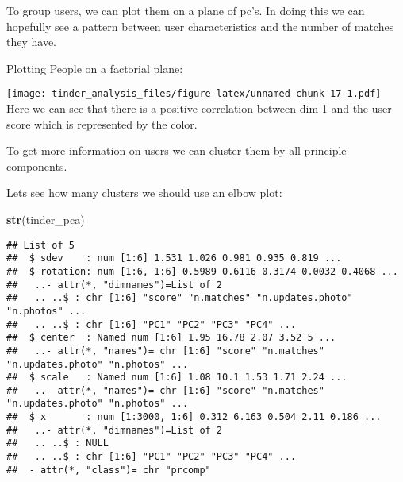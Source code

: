 \documentclass[
]{article}
\newenvironment{Shaded}{\begin{snugshade}}{\end{snugshade}}
\newcommand{\AttributeTok}[1]{\textcolor[rgb]{0.13,0.29,0.53}{#1}}
\newcommand{\CommentTok}[1]{\textcolor[rgb]{0.56,0.35,0.01}{\textit{#1}}}
\newcommand{\ConstantTok}[1]{\textcolor[rgb]{0.56,0.35,0.01}{#1}}
\newcommand{\DecValTok}[1]{\textcolor[rgb]{0.00,0.00,0.81}{#1}}
\newcommand{\FunctionTok}[1]{\textcolor[rgb]{0.13,0.29,0.53}{\textbf{#1}}}
\newcommand{\NormalTok}[1]{#1}
\newcommand{\SpecialCharTok}[1]{\textcolor[rgb]{0.81,0.36,0.00}{\textbf{#1}}}
\newcommand{\StringTok}[1]{\textcolor[rgb]{0.31,0.60,0.02}{#1}}
\begin{document}
To group users, we can plot them on a plane of pc's. In doing this we
can hopefully see a pattern between user characteristics and the number
of matches they have.

Plotting People on a factorial plane:

\begin{Shaded}
\end{Shaded}

\texttt{[image: tinder\_analysis\_files/figure-latex/unnamed-chunk-17-1.pdf]}
Here we can see that there is a positive correlation between dim 1 and
the user score which is represented by the color.

To get more information on users we can cluster them by all principle
components.

Lets see how many clusters we should use an elbow plot:

\begin{Shaded}
\begin{Highlighting}[]
\FunctionTok{str}\NormalTok{(tinder\_pca)}
\end{Highlighting}
\end{Shaded}

\begin{verbatim}
## List of 5
##  $ sdev    : num [1:6] 1.531 1.026 0.981 0.935 0.819 ...
##  $ rotation: num [1:6, 1:6] 0.5989 0.6116 0.3174 0.0032 0.4068 ...
##   ..- attr(*, "dimnames")=List of 2
##   .. ..$ : chr [1:6] "score" "n.matches" "n.updates.photo" "n.photos" ...
##   .. ..$ : chr [1:6] "PC1" "PC2" "PC3" "PC4" ...
##  $ center  : Named num [1:6] 1.95 16.78 2.07 3.52 5 ...
##   ..- attr(*, "names")= chr [1:6] "score" "n.matches" "n.updates.photo" "n.photos" ...
##  $ scale   : Named num [1:6] 1.08 10.1 1.53 1.71 2.24 ...
##   ..- attr(*, "names")= chr [1:6] "score" "n.matches" "n.updates.photo" "n.photos" ...
##  $ x       : num [1:3000, 1:6] 0.312 6.163 0.504 2.11 0.186 ...
##   ..- attr(*, "dimnames")=List of 2
##   .. ..$ : NULL
##   .. ..$ : chr [1:6] "PC1" "PC2" "PC3" "PC4" ...
##  - attr(*, "class")= chr "prcomp"
\end{verbatim}
\end{document}
